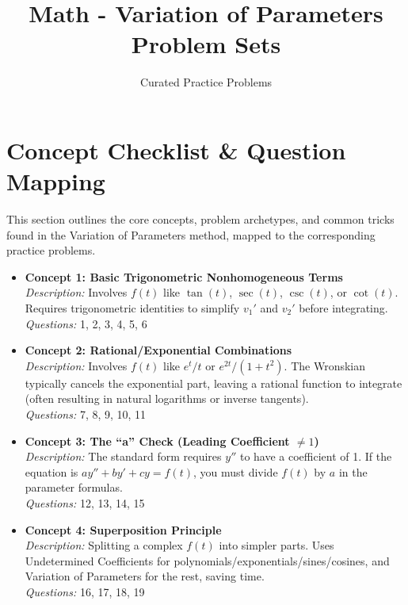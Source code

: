 \documentclass[11pt]{article}
\title{Math - Variation of Parameters Problem Sets}
\author{Curated Practice Problems}
\date{}
\begin{document}
\maketitle

\tableofcontents
\newpage

\section{Concept Checklist \& Question Mapping}
This section outlines the core concepts, problem archetypes, and common tricks found in the Variation of Parameters method, mapped to the corresponding practice problems.

\begin{itemize}
    \item \textbf{Concept 1: Basic Trigonometric Nonhomogeneous Terms} \\
    \textit{Description:} Involves $f(t)$ like $\tan(t)$, $\sec(t)$, $\csc(t)$, or $\cot(t)$. Requires trigonometric identities to simplify $v_1'$ and $v_2'$ before integrating. \\
    \textit{Questions:} 1, 2, 3, 4, 5, 6
    
    \item \textbf{Concept 2: Rational/Exponential Combinations} \\
    \textit{Description:} Involves $f(t)$ like $e^t/t$ or $e^{2t}/(1+t^2)$. The Wronskian typically cancels the exponential part, leaving a rational function to integrate (often resulting in natural logarithms or inverse tangents). \\
    \textit{Questions:} 7, 8, 9, 10, 11
    
    \item \textbf{Concept 3: The ``a'' Check (Leading Coefficient $\neq 1$)} \\
    \textit{Description:} The standard form requires $y''$ to have a coefficient of 1. If the equation is $ay'' + by' + cy = f(t)$, you must divide $f(t)$ by $a$ in the parameter formulas. \\
    \textit{Questions:} 12, 13, 14, 15
    
    \item \textbf{Concept 4: Superposition Principle} \\
    \textit{Description:} Splitting a complex $f(t)$ into simpler parts. Uses Undetermined Coefficients for polynomials/exponentials/sines/cosines, and Variation of Parameters for the rest, saving time. \\
    \textit{Questions:} 16, 17, 18, 19
    

\end{itemize}
\end{document}
